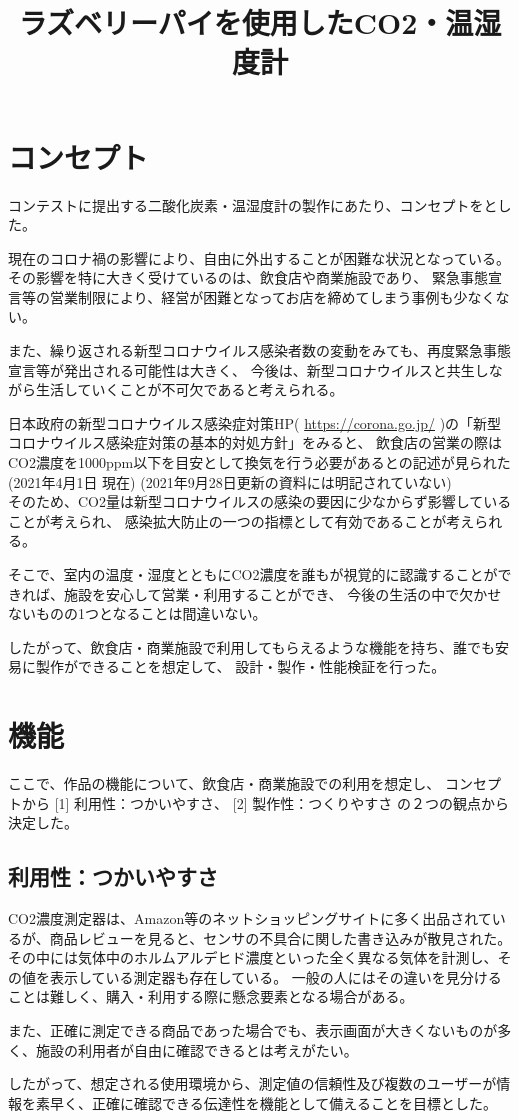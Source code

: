 \documentclass[a4paper]{jsarticle}
\author{}
\title{ラズベリーパイを使用したCO2・温湿度計}
\date{}
\begin{document}
\maketitle
\section{コンセプト}
コンテストに提出する二酸化炭素・温湿度計の製作にあたり、コンセプトをとした。\par
現在のコロナ禍の影響により、自由に外出することが困難な状況となっている。
その影響を特に大きく受けているのは、飲食店や商業施設であり、
緊急事態宣言等の営業制限により、経営が困難となってお店を締めてしまう事例も少なくない。\par
また、繰り返される新型コロナウイルス感染者数の変動をみても、再度緊急事態宣言等が発出される可能性は大きく、
今後は、新型コロナウイルスと共生しながら生活していくことが不可欠であると考えられる。\par
日本政府の新型コロナウイルス感染症対策HP( \url{https://corona.go.jp/} )の「新型コロナウイルス感染症対策の基本的対処方針」をみると、
飲食店の営業の際はCO2濃度を1000ppm以下を目安として換気を行う必要があるとの記述が見られた(2021年4月1日 現在) (2021年9月28日更新の資料には明記されていない)\\
そのため、CO2量は新型コロナウイルスの感染の要因に少なからず影響していることが考えられ、
感染拡大防止の一つの指標として有効であることが考えられる。\par
そこで、室内の温度・湿度とともにCO2濃度を誰もが視覚的に認識することができれば、施設を安心して営業・利用することができ、
今後の生活の中で欠かせないものの1つとなることは間違いない。\par
したがって、飲食店・商業施設で利用してもらえるような機能を持ち、誰でも安易に製作ができることを想定して、
設計・製作・性能検証を行った。
\section{機能}
ここで、作品の機能について、飲食店・商業施設での利用を想定し、
コンセプトから [1] 利用性：つかいやすさ、 [2] 製作性：つくりやすさ の２つの観点から決定した。
\subsection{利用性：つかいやすさ}
CO2濃度測定器は、Amazon等のネットショッピングサイトに多く出品されているが、商品レビューを見ると、センサの不具合に関した書き込みが散見された。
その中には気体中のホルムアルデヒド濃度といった全く異なる気体を計測し、その値を表示している測定器も存在している。
一般の人にはその違いを見分けることは難しく、購入・利用する際に懸念要素となる場合がある。\par
また、正確に測定できる商品であった場合でも、表示画面が大きくないものが多く、施設の利用者が自由に確認できるとは考えがたい。\par
したがって、想定される使用環境から、測定値の信頼性及び複数のユーザーが情報を素早く、正確に確認できる伝達性を機能として備えることを目標とした。
\end{document}
